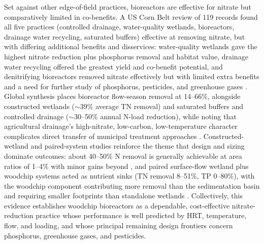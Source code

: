 Set against other edge-of-field practices, bioreactors are effective for nitrate but comparatively limited in co-benefits. A US Corn Belt review of 119 records found all five practices (controlled drainage, water-quality wetlands, bioreactors, drainage water recycling, saturated buffers) effective at removing nitrate, but with differing additional benefits and disservices: water-quality wetlands gave the highest nitrate reduction plus phosphorus removal and habitat value, drainage water recycling offered the greatest yield and co-benefit potential, and denitrifying bioreactors removed nitrate effectively but with limited extra benefits and a need for further study of phosphorus, pesticides, and greenhouse gases \parencite{Mitchell2023}. Global synthesis places bioreactor flow-season removal at 14--66\%, alongside constructed wetlands ($\sim$39\% average TN removal) and saturated buffers and controlled drainage ($\sim$30--50\% annual N-load reduction), while noting that agricultural drainage's high-nitrate, low-carbon, low-temperature character complicates direct transfer of municipal treatment approaches \parencite{Wang2025b}. Constructed-wetland and paired-system studies reinforce the theme that design and sizing dominate outcomes: about 40--50\% N removal is generally achievable at area ratios of 1--4\% with minor gains beyond \parencite{Mendes2021}, and paired surface-flow wetland plus woodchip systems acted as nutrient sinks (TN removal 8--51\%, TP 0--80\%), with the woodchip component contributing more removal than the sedimentation basin and requiring smaller footprints than standalone wetlands \parencite{Pugliese2020}. Collectively, this evidence establishes woodchip bioreactors as a dependable, cost-effective nitrate-reduction practice whose performance is well predicted by HRT, temperature, flow, and loading, and whose principal remaining design frontiers concern phosphorus, greenhouse gases, and pesticides.